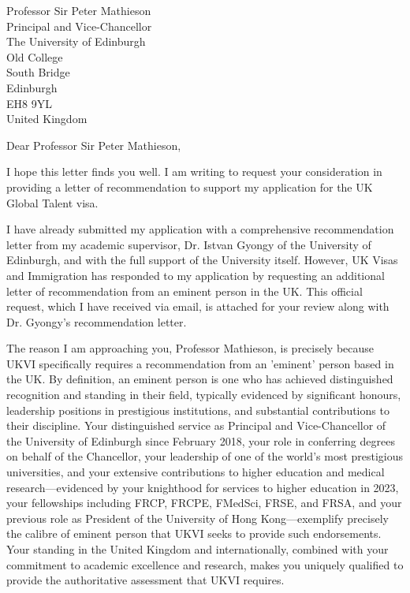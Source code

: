 \documentclass[12pt,a4paper]{letter}
\begin{document}
\begin{letter}{Professor Sir Peter Mathieson\\Principal and Vice-Chancellor\\The University of Edinburgh\\Old College\\South Bridge\\Edinburgh\\EH8 9YL\\United Kingdom}

\date{\today}

\opening{Dear Professor Sir Peter Mathieson,}

I hope this letter finds you well. I am writing to request your consideration in providing a letter of recommendation to support my application for the UK Global Talent visa.

I have already submitted my application with a comprehensive recommendation letter from my academic supervisor, Dr. Istvan Gyongy of the University of Edinburgh, and with the full support of the University itself. However, UK Visas and Immigration has responded to my application by requesting an additional letter of recommendation from an eminent person in the UK. This official request, which I have received via email, is attached for your review along with Dr. Gyongy's recommendation letter.

The reason I am approaching you, Professor Mathieson, is precisely because UKVI specifically requires a recommendation from an 'eminent' person based in the UK. By definition, an eminent person is one who has achieved distinguished recognition and standing in their field, typically evidenced by significant honours, leadership positions in prestigious institutions, and substantial contributions to their discipline. Your distinguished service as Principal and Vice-Chancellor of the University of Edinburgh since February 2018, your role in conferring degrees on behalf of the Chancellor, your leadership of one of the world's most prestigious universities, and your extensive contributions to higher education and medical research—evidenced by your knighthood for services to higher education in 2023, your fellowships including FRCP, FRCPE, FMedSci, FRSE, and FRSA, and your previous role as President of the University of Hong Kong—exemplify precisely the calibre of eminent person that UKVI seeks to provide such endorsements. Your standing in the United Kingdom and internationally, combined with your commitment to academic excellence and research, makes you uniquely qualified to provide the authoritative assessment that UKVI requires.


\end{letter}
\end{document}
